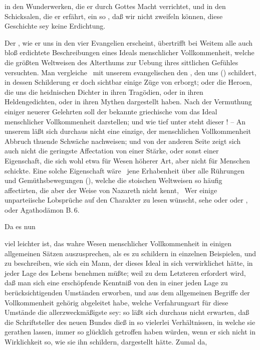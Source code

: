 \begin{aufza}
\begin{aufzb}
\item in den Wunderwerken, die er durch Gottes Macht verrichtet, und in den Schicksalen, die er erfährt, ein so , daß wir nicht zweifeln können, diese Geschichte sey keine Erdichtung.~
\end{aufzb}
\item Der , wie er uns in den vier Evangelien erscheint, übertrifft bei Weitem alle auch bloß erdichtete Beschreibungen eines Ideals menschlicher Vollkommenheit, welche die größten Weltweisen des Alterthums zur Uebung ihres sittlichen Gefühles versuchten. Man vergleiche \zB\ mit unserem evangelischen  den , den uns  () schildert, in dessen Schilderung er doch sichtbar einige Züge von  erborgt; oder die Heroen, die uns die heidnischen Dichter in ihren Tragödien, oder in ihren Heldengedichten, oder in ihren Mythen dargestellt haben. Nach der Vermuthung einiger neuerer Gelehrten soll der bekannte griechische  vom  das Ideal menschlicher Vollkommenheit darstellen; und wie tief unter  steht dieser ! -- An unserem  läßt sich durchaus nicht eine einzige, der menschlichen Vollkommenheit Abbruch thuende Schwäche nachweisen; und von der anderen Seite zeigt sich auch nicht die geringste Affectation von einer Stärke, oder sonst einer Eigenschaft, die sich wohl etwa für Wesen höherer Art, aber nicht für Menschen schickte. Eine solche Eigenschaft wäre \zB\ jene Erhabenheit über alle Rührungen und Gemüthsbewegungen (), welche die stoischen Weltweisen so häufig affectirten, die aber der Weise von Nazareth nicht kennt, \udgl\  Wer einige unparteiische Lobsprüche auf den Charakter  zu lesen wünscht, sehe   oder   oder  , oder  Agathodämon B.\,6. \uAm\
\item Da es nun 
\begin{aufzb}
\item viel leichter ist, das wahre Wesen menschlicher Vollkommenheit in einigen allgemeinen Sätzen auszusprechen, als es zu schildern in einzelnen Beispielen, und zu beschreiben, wie sich ein Mann, der dieses Ideal in sich verwirklichet hätte, in jeder Lage des Lebens benehmen müßte; weil zu dem Letzteren erfordert wird, daß man sich eine erschöpfende Kenntniß von den in einer jeden Lage zu berücksichtigenden Umständen erworben, und aus dem allgemeinen Begriffe der Vollkommenheit gehörig abgeleitet habe, welche Verfahrungsart für diese Umstände die allerzweckmäßigste sey: so läßt sich durchaus nicht erwarten, daß die Schriftsteller des neuen Bundes dieß in so vielerlei Verhältnissen, in welche sie  gerathen lassen, immer so glücklich getroffen haben würden, wenn er sich nicht in Wirklichkeit so, wie sie ihn schildern, dargestellt hätte. Zumal da,

\end{aufzb}
\end{aufza}
